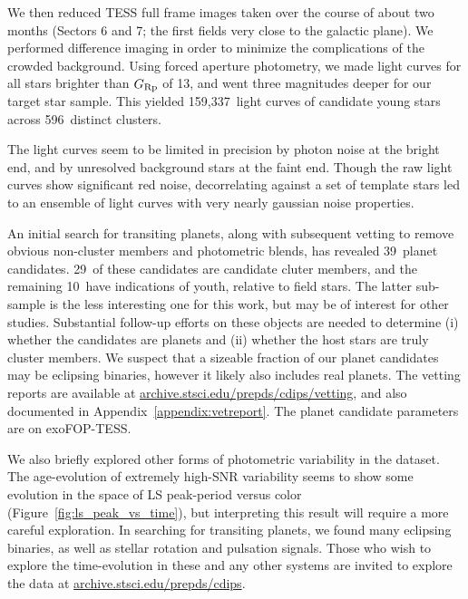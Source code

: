 \documentclass[12pt,twocolumn,tighten]{aastex62}
\newcommand{\numberpcs}{39\ }  %
\newcommand{\numberzaripcs}{10\ }  %
\newcommand{\numberclusterpcs}{29\ }  %
\newcommand{\numberlcs}{159{,}337\ } %
\newcommand{\numberclusters}{596\ } %
\newcommand{\stscilink}{\url{archive.stsci.edu/prepds/cdips}}
\newcommand{\stscivetlink}{\url{archive.stsci.edu/prepds/cdips/vetting}}
\begin{document}
We then reduced TESS full frame images taken over the course of about
two months (Sectors 6 and 7; the first fields very close to the galactic
plane).
We performed difference imaging in order to minimize the complications
of the crowded background.
Using forced aperture photometry, we made light curves for all stars
brighter than $G_{\rm Rp}$ of 13, and went three magnitudes deeper for
our target star sample.
This yielded \numberlcs light curves of candidate young stars across
\numberclusters distinct clusters.

The light curves seem to be limited in precision by photon noise at
the bright end, and by unresolved background stars at the faint end.
Though the raw light curves show significant red noise, decorrelating
against a set of template stars led to an ensemble of light curves
with very nearly gaussian noise properties.

An initial search for transiting planets, along with subsequent
vetting to remove obvious non-cluster members and photometric blends,
has revealed \numberpcs planet candidates.
\numberclusterpcs of these candidates are candidate cluter members,
and the remaining \numberzaripcs have indications of youth, relative
to field stars.
The latter sub-sample is the less interesting one for this work, but
may be of interest for other studies.
Substantial follow-up efforts on these objects are needed to determine
(i) whether the candidates are planets and (ii) whether the host stars
are truly cluster members.
We suspect that a sizeable fraction of our planet candidates may
be eclipsing binaries, however it likely also includes real planets.
The vetting reports are available at \stscivetlink, and also documented
in Appendix~\ref{appendix:vetreport}.
The planet candidate parameters are on exoFOP-TESS.

We also briefly explored other forms of photometric variability in the
dataset.
The age-evolution of extremely high-SNR variability seems to show some
evolution in the space of LS peak-period versus color
(Figure~\ref{fig:ls_peak_vs_time}), but interpreting this result will
require a more careful exploration.
In searching for transiting planets, we found many eclipsing binaries,
as well as stellar rotation and pulsation signals.
Those who wish to explore the time-evolution in these and any other
systems are invited to explore the data at \stscilink.
\end{document}
